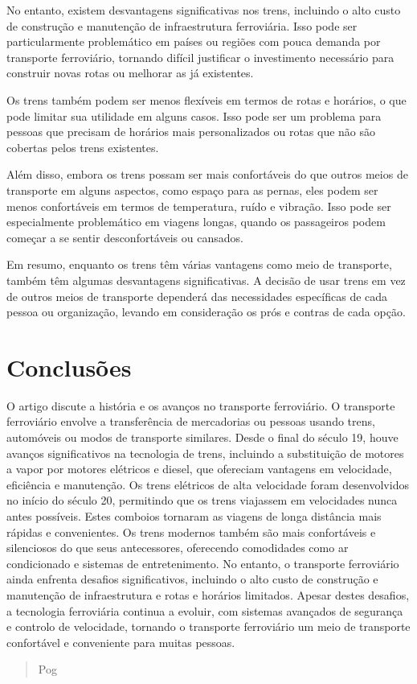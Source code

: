 \documentclass{report}
\begin{document}
No entanto, existem desvantagens significativas nos trens, incluindo o alto custo de construção e manutenção de infraestrutura ferroviária. Isso pode ser particularmente problemático em países ou regiões com pouca demanda por transporte ferroviário, tornando difícil justificar o investimento necessário para construir novas rotas ou melhorar as já existentes.

Os trens também podem ser menos flexíveis em termos de rotas e horários, o que pode limitar sua utilidade em alguns casos. Isso pode ser um problema para pessoas que precisam de horários mais personalizados ou rotas que não são cobertas pelos trens existentes.

Além disso, embora os trens possam ser mais confortáveis do que outros meios de transporte em alguns aspectos, como espaço para as pernas, eles podem ser menos confortáveis em termos de temperatura, ruído e vibração. Isso pode ser especialmente problemático em viagens longas, quando os passageiros podem começar a se sentir desconfortáveis ou cansados.

Em resumo, enquanto os trens têm várias vantagens como meio de transporte, também têm algumas desvantagens significativas. A decisão de usar trens em vez de outros meios de transporte dependerá das necessidades específicas de cada pessoa ou organização, levando em consideração os prós e contras de cada opção.
\newpage
\section{Conclus\~oes}
O artigo discute a história e os avanços no transporte ferroviário. O transporte ferroviário envolve a transferência de mercadorias ou pessoas usando trens, automóveis ou modos de transporte similares. Desde o final do século 19, houve avanços significativos na tecnologia de trens, incluindo a substituição de motores a vapor por motores elétricos e diesel, que ofereciam vantagens em velocidade, eficiência e manutenção. Os trens elétricos de alta velocidade foram desenvolvidos no início do século 20, permitindo que os trens viajassem em velocidades nunca antes possíveis. Estes comboios tornaram as viagens de longa distância mais rápidas e convenientes. 
Os trens modernos também são mais confortáveis e silenciosos do que seus antecessores, oferecendo comodidades como ar condicionado e sistemas de entretenimento. No entanto, o transporte ferroviário ainda enfrenta desafios significativos, incluindo o alto custo de construção e manutenção de infraestrutura e rotas e horários limitados. Apesar destes desafios, a tecnologia ferroviária continua a evoluir, com sistemas avançados de segurança e controlo de velocidade, tornando o transporte ferroviário um meio de transporte confortável e conveniente para muitas pessoas.
\begin{abstract}
  Pog
\end{abstract}
\end{document}
